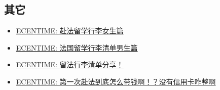 \subsection{其它}
\begin{itemize}
    \item \href{https://www.ecentime.com/article/nvshengqingdan}{ECENTIME: 赴法留学行李女生篇}
    \item \href{https://www.ecentime.com/article/nanshengqingdan}{ECENTIME: 法国留学行李清单男生篇}
    \item \href{https://www.ecentime.com/article/qingdan}{ECENTIME: 留法行李清单分享！}
    \item \href{https://www.ecentime.com/article/daiqian}{ECENTIME: 第一次赴法到底怎么带钱啊！？没有信用卡咋整啊}
\end{itemize}

